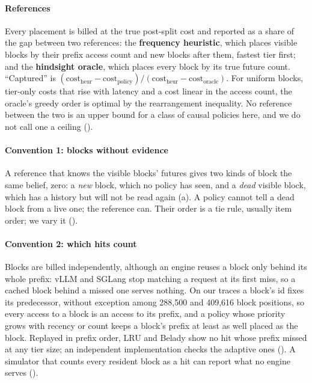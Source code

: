 \paragraph{References} Every placement is billed at the true post-split cost and reported as a share of
the gap between two references: the \textbf{frequency heuristic}, which places visible blocks by their
prefix access count and new blocks after them, fastest tier first; and the \textbf{hindsight oracle},
which places every block by its true future count. ``Captured'' is
$(\text{cost}_{\text{heur}} - \text{cost}_{\text{policy}})/(\text{cost}_{\text{heur}} - \text{cost}_{\text{oracle}})$.
For uniform blocks, tier-only costs that rise with latency and a cost linear in the access count, the
oracle's greedy order is optimal by the rearrangement inequality. No reference between the two is an
upper bound for a class of causal policies here, and we do not call one a ceiling ().

\paragraph{Convention 1: blocks without evidence} A reference that knows the visible blocks' futures gives two
kinds of block the same belief, zero: a \emph{new} block, which no policy has seen, and a \emph{dead} visible
block, which has a history but will not be read again (a). A policy cannot tell a dead
block from a live one; the reference can. Their order is a tie rule, usually item order; we vary it
().

\paragraph{Convention 2: which hits count} Blocks are billed independently, although an engine reuses a block
only behind its whole prefix: vLLM and SGLang stop matching a request at its first miss, so a cached block
behind a missed one serves nothing. On our traces a block's id fixes its predecessor, without exception
among 288{,}500 and 409{,}616 block positions, so every access to a block is an access to its prefix, and a
policy whose priority grows with recency or count keeps a block's prefix at least as well placed as the
block. Replayed in prefix order, LRU and Belady show no hit whose prefix missed at any tier size; an
independent implementation checks the adaptive ones (). A simulator that counts every
resident block as a hit can report what no engine serves ().

